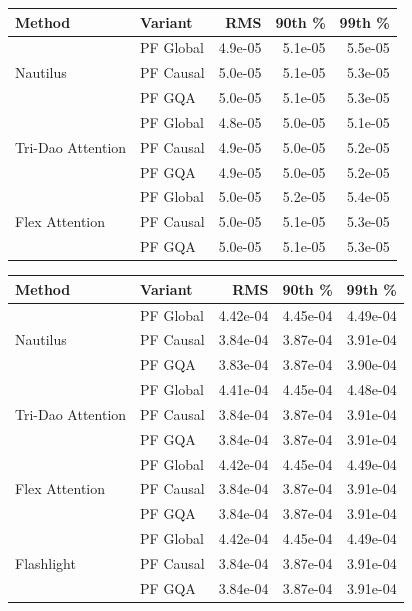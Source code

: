 \begin{minipage}[t]{0.5\textwidth}
\vspace{0pt}
\centering\footnotesize\setlength{\tabcolsep}{4pt}

\label{tab:numeric_error_absolute_error}
\begin{tabular}{llrrr}
\hline
Method & Variant & RMS & 90th \% & 99th \% \\
\hline
\multirow{3}{*}{Nautilus}
& PF Global & 4.9e-05 & 5.1e-05 & 5.5e-05 \\
& PF Causal & 5.0e-05 & 5.1e-05 & 5.3e-05 \\
& PF GQA    & 5.0e-05 & 5.1e-05 & 5.3e-05 \\
\hline
\multirow{3}{*}{Tri-Dao Attention}
& PF Global & 4.8e-05 & 5.0e-05 & 5.1e-05 \\
& PF Causal & 4.9e-05 & 5.0e-05 & 5.2e-05 \\
& PF GQA    & 4.9e-05 & 5.0e-05 & 5.2e-05 \\
\hline
\multirow{3}{*}{Flex Attention}
& PF Global & 5.0e-05 & 5.2e-05 & 5.4e-05 \\
& PF Causal & 5.0e-05 & 5.1e-05 & 5.3e-05 \\
& PF GQA    & 5.0e-05 & 5.1e-05 & 5.3e-05 \\
\hline
\end{tabular}

\vspace{1em}
\label{tab:numeric_error_absolute_error_bf16}
\begin{tabular}{llrrr}
\hline
Method & Variant & RMS & 90th \% & 99th \% \\
\hline
\multirow{3}{*}{Nautilus}
& PF Global & 4.42e-04 & 4.45e-04 & 4.49e-04 \\
& PF Causal & 3.84e-04 & 3.87e-04 & 3.91e-04 \\
& PF GQA    & 3.83e-04 & 3.87e-04 & 3.90e-04 \\
\hline
\multirow{3}{*}{Tri-Dao Attention}
& PF Global & 4.41e-04 & 4.45e-04 & 4.48e-04 \\
& PF Causal & 3.84e-04 & 3.87e-04 & 3.91e-04 \\
& PF GQA    & 3.84e-04 & 3.87e-04 & 3.91e-04 \\
\hline
\multirow{3}{*}{Flex Attention}
& PF Global & 4.42e-04 & 4.45e-04 & 4.49e-04 \\
& PF Causal & 3.84e-04 & 3.87e-04 & 3.91e-04 \\
& PF GQA    & 3.84e-04 & 3.87e-04 & 3.91e-04 \\
\hline
\multirow{3}{*}{Flashlight}
& PF Global & 4.42e-04 & 4.45e-04 & 4.49e-04 \\
& PF Causal & 3.84e-04 & 3.87e-04 & 3.91e-04 \\
& PF GQA    & 3.84e-04 & 3.87e-04 & 3.91e-04 \\
\hline
\end{tabular}


\end{minipage}
